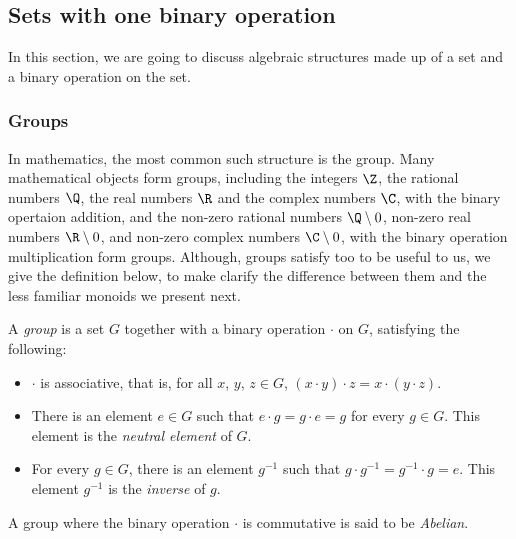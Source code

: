 \subsection{Sets with one binary operation} %
In this section, we are going to discuss algebraic structures made up of a set and a binary operation on the set.
\subsubsection{Groups}
In mathematics, the most common such structure is the group. Many mathematical objects form groups, including the integers $\Z$, the rational numbers $\Q$, the real numbers $\R$ and the complex numbers $\C$, with the binary opertaion addition, and the non-zero rational numbers $\Q\setminus{0}$, non-zero real numbers $\R\setminus{0}$, and non-zero complex numbers $\C\setminus{0}$, with the binary operation multiplication form groups. Although, groups satisfy too to be useful to us, we give the definition below, to make clarify the difference between them and the less familiar monoids we present next.
\begin{Definition}
A \emph{group} is a set $G$ together with a binary operation $\cdot$ on $G$, satisfying the following:
\begin{itemize}
\item $\cdot$ is associative, that is, for all $x$, $y$, $z \in G$, $(x \cdot y) \cdot z = x \cdot (y \cdot z)$. 
\item There is an element $e \in G$ such that $e \cdot g = g \cdot e = g$ for every $g \in G$. This element is the \emph{neutral element} of $G$.
\item For every $g \in G$, there is an element $g^{-1}$ such that $g \cdot g^{-1} = g^{-1} \cdot g = e$. This element $g^{-1}$ is the \emph{inverse} of $g$.
\end{itemize}
\end{Definition}
A group where the binary operation $\cdot$ is commutative is said to be \emph{Abelian}.


